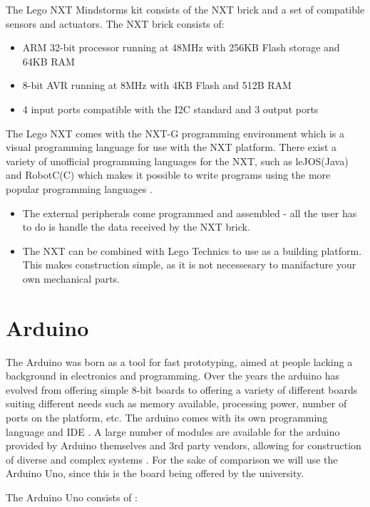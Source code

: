 The Lego NXT Mindstorms kit consists of the NXT brick and a set of
compatible sensors and actuators. The NXT brick \citep[P.70]{NXTStats} consists
of:

\begin{itemize}
  \item ARM 32-bit processor running at 48MHz with 256KB Flash storage and 64KB RAM
  \item 8-bit AVR running at 8MHz with 4KB Flash and 512B RAM
  \item 4 input ports compatible with the I2C standard and 3 output ports
\end{itemize}

The Lego NXT comes with the NXT-G programming environment which is a visual
programming language for use with the NXT platform. There exist a variety of
unofficial programming languages for the NXT, such as leJOS(Java) and
RobotC(C) which makes it possible to write programs using the more popular programming
languages \citep{NXTProgrammingLanguage}.

\begin{itemize}
  \item The external peripherals come programmed and assembled - all the user
  has to do is handle the data received by the NXT brick.
  \item The NXT can be combined with Lego Technics to use as a building
  platform. This makes construction simple, as it is not necessesary to
  manifacture your own mechanical parts.
\end{itemize}

\section{Arduino}
The Arduino was born as a tool for fast prototyping, aimed at people lacking a
background in electronics and programming. Over the years the arduino has
evolved from offering simple 8-bit boards to offering a variety of different
boards suiting different needs such as memory available, processing power,
number of ports on the platform, etc. The arduino comes with its
own programming language and IDE \citep{ArduinoIntro}. A large number of modules are available for
the arduino provided by Arduino themselves and 3rd party vendors, allowing for
construction of diverse and complex systems \citep{ArduinoComponents}. For the
sake of comparison we will use the Arduino Uno, since this is the board being
offered by the university.\nl

The Arduino Uno consists of \Source:

